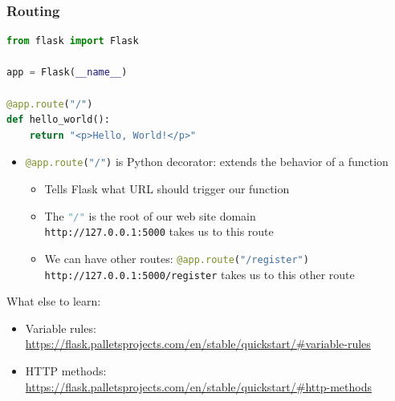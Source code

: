 \documentclass[fleqn,aspectratio=169,10pt]{beamer}
\begin{document}
\begin{frame}[fragile]
  \frametitle{Routing}
      \vspace*{-2ex}
\begin{lstlisting}[language=Python]
from flask import Flask

app = Flask(__name__)

@app.route("/")
def hello_world():
    return "<p>Hello, World!</p>"
\end{lstlisting}

  \begin{itemize}
    \item \lstinline[language=Python]!@app.route("/")! is Python decorator: extends the behavior of a function
          \begin{itemize}
            \item Tells Flask what URL should trigger our function
            \item The \lstinline[language=Python]!"/"! is the root of our web site domain \\
                  \texttt{http://127.0.0.1:5000} takes us to this route
            \item We can have other routes: \lstinline[language=Python]!@app.route("/register")! \\
                  \texttt{http://127.0.0.1:5000/register} takes us to this other route
          \end{itemize}
  \end{itemize}
  \pause
  \begin{block}{What else to learn:}
    \begin{itemize}
      \item Variable rules: \url{https://flask.palletsprojects.com/en/stable/quickstart/#variable-rules}
      \item HTTP methods: \url{https://flask.palletsprojects.com/en/stable/quickstart/#http-methods}
    \end{itemize}
  \end{block}
\end{frame}
\end{document}

